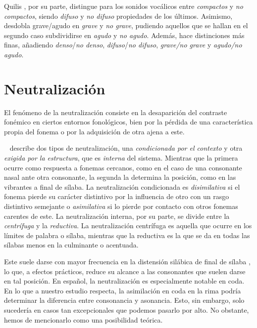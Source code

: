 Quilis \parencite*[165-167]{quilis2019}, por su parte, distingue para los sonidos vocálicos entre \textit{compactos} y \textit{no compactos}, siendo \textit{difuso} y \textit{no difuso} propiedades de los últimos. Asimismo, desdobla grave/agudo en \textit{grave} y \textit{no grave}, pudiendo aquellos que se hallan en el segundo caso subdividirse en \textit{agudo} y \textit{no agudo}. Además, hace distinciones más finas, añadiendo \textit{denso}/\textit{no denso}, \textit{difuso}/\textit{no difuso}, \textit{grave/no grave} y \textit{agudo/no agudo}.

\section{Neutralización}
El fenómeno de la neutralización consiste en la desaparición del contraste fonémico en ciertos entornos fonológicos, bien por la pérdida de una característica propia del fonema o por la adquisición de otra ajena a este. 

\citeauthor{alarcos1964}~\parencite*[97-99]{alarcos1964} describe dos tipos de neutralización, una \textit{condicionada por el contexto} y otra \textit{exigida por la estructura}, que es \textit{interna} del sistema. Mientras que la primera ocurre como respuesta a fonemas cercanos, como en el caso de una consonante nasal ante otra consonante, la segunda la determina la posición, como en las vibrantes a final de sílaba. La neutralización condicionada es \textit{disimilativa} si el fonema pierde su carácter distintivo por la influencia de otro con un rasgo distintivo semejante o \textit{asimilativa} si lo pierde por contacto con otros fonemas carentes de este. La neutralización interna, por su parte, se divide entre la \textit{centrífuga} y la \textit{reductiva}. La neutralización centrífuga es aquella que ocurre en los límites de palabra o sílaba, mientras que la reductiva es la que se da en todas las sílabas menos en la culminante o acentuada.

Este suele darse con mayor frecuencia en la distensión silábica de final de sílaba \parencite[180]{alarcos1964}, lo que, a efectos prácticos, reduce su alcance a las consonantes que suelen darse en tal posición. En español, la neutralización es especialmente notable en coda. En lo que a nuestro estudio respecta, la asimilación en coda en la rima podría determinar la diferencia entre consonancia y asonancia. Esto, sin embargo, solo sucedería en casos tan excepcionales que podemos pasarlo por alto. No obstante, hemos de mencionarlo como una posibilidad teórica.

